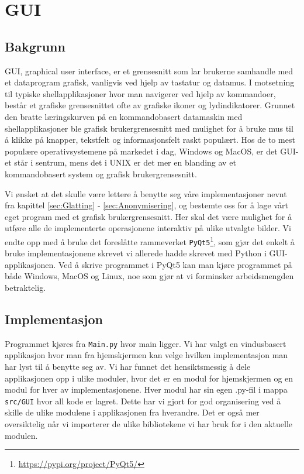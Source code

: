 \section{GUI}
\label{sec:Gui}
\subsection{Bakgrunn}
GUI, graphical user interface, er et grensesnitt som lar brukerne samhandle med et dataprogram grafisk, vanligvis ved hjelp av tastatur og datamus. I motsetning til typiske shellapplikasjoner hvor man navigerer ved hjelp av kommandoer, består et grafiske grensesnittet ofte av grafiske ikoner og lydindikatorer.\cite{wiki:GUI} Grunnet den bratte læringskurven på en kommandobasert datamaskin med shellapplikasjoner ble grafisk brukergrensesnitt med mulighet for å bruke mus til å klikke på knapper, tekstfelt og informasjonsfelt raskt populært. Hos de to mest populære operativsystemene på markedet i dag, Windows og MacOS, er det GUI-et står i sentrum, mens det i UNIX er det mer en blanding av et kommandobasert system og grafisk brukergrensesnitt.

Vi ønsket at det skulle være lettere å benytte seg våre implementasjoner nevnt fra kapittel \ref{sec:Glatting} - \ref{sec:Anonymisering}, og bestemte oss for å lage vårt eget program med et grafisk brukergrensesnitt. Her skal det være mulighet for å utføre alle de implementerte operasjonene interaktiv på ulike utvalgte bilder. Vi endte opp med å bruke det foreslåtte rammeverket \texttt{PyQt5}\footnote{\url{https://pypi.org/project/PyQt5/}}, som gjør det enkelt å bruke implementasjonene skrevet vi allerede hadde skrevet med Python i GUI-applikasjonen. Ved å skrive programmet i PyQt5 kan man kjøre programmet på både Windows, MacOS og Linux, noe som gjør at vi forminsker arbeidsmengden betraktelig.

\subsection{Implementasjon}
\label{sec:GUIimpl}
Programmet kjøres fra \texttt{Main.py} hvor main ligger. Vi har valgt en vindusbasert applikasjon hvor man fra hjemskjermen kan velge hvilken implementasjon man har lyst til å benytte seg av. Vi har funnet det hensiktsmessig å dele applikasjonen opp i ulike moduler, hvor det er en modul for hjemskjermen og en modul for hver av implementasjonene. Hver modul har sin egen .py-fil i mappa \texttt{src/GUI} hvor all kode er lagret. Dette har vi gjort for god organisering ved å skille de ulike modulene i applikasjonen fra hverandre. Det er også mer oversiktelig når vi importerer de ulike bibliotekene vi har bruk for i den aktuelle modulen. 

